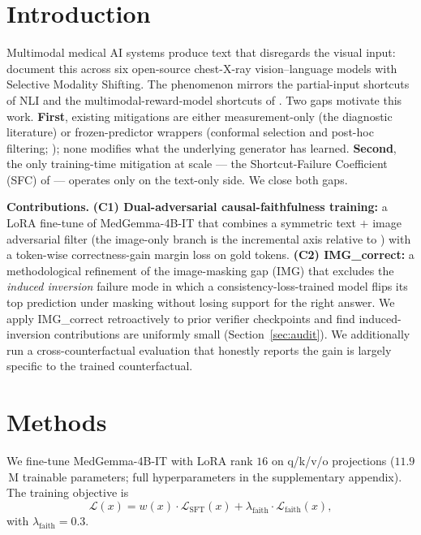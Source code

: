 \documentclass{article}
\begin{document}
\section{Introduction}
\label{sec:intro}

Multimodal medical AI systems produce text that disregards the
visual input: \citet{restrepo2025sms} document this across six
open-source chest-X-ray vision--language models with Selective
Modality Shifting. The phenomenon mirrors the partial-input
shortcuts of NLI \citep{gururangan2018annotation,
poliak2018hypothesis} and the multimodal-reward-model shortcuts of
\citet{li2025sfc}. Two gaps motivate this work. \textbf{First},
existing mitigations are either measurement-only (the diagnostic
literature) or frozen-predictor wrappers (conformal selection and
post-hoc filtering; \citealp{gui2024conformal, li2025conflvlm,
mohri2024conformal}); none modifies what the underlying generator
has learned. \textbf{Second}, the only training-time mitigation at
scale --- the Shortcut-Failure Coefficient (SFC) of
\citet{li2025sfc} --- operates only on the text-only side. We close
both gaps.

\textbf{Contributions.} \textbf{(C1) Dual-adversarial
causal-faithfulness training:} a LoRA fine-tune of MedGemma-4B-IT
\citep{google2024medgemma, hu2022lora} that combines a symmetric
text $+$ image adversarial filter (the image-only branch is the
incremental axis relative to \citealp{li2025sfc}) with a
token-wise correctness-gain margin loss on gold tokens.
\textbf{(C2) IMG\_correct:} a methodological refinement of the
image-masking gap (IMG) that excludes the \emph{induced inversion}
failure mode in which a consistency-loss-trained model flips its
top prediction under masking without losing support for the right
answer. We apply IMG\_correct retroactively to prior verifier
checkpoints and find induced-inversion contributions are uniformly
small (Section~\ref{sec:audit}). We additionally run a
cross-counterfactual evaluation that honestly reports the gain is
largely specific to the trained counterfactual.

\section{Methods}
\label{sec:methods}

We fine-tune MedGemma-4B-IT \citep{google2024medgemma} with LoRA
\citep{hu2022lora} rank $16$ on q/k/v/o projections
($11.9$\,M trainable parameters; full hyperparameters in
the supplementary appendix). The training objective is
\begin{equation}
\mathcal{L}(x) = w(x)\cdot\mathcal{L}_{\mathrm{SFT}}(x) +
\lambda_{\mathrm{faith}}\cdot\mathcal{L}_{\mathrm{faith}}(x),
\end{equation}
with $\lambda_{\mathrm{faith}} = 0.3$.
\end{document}
